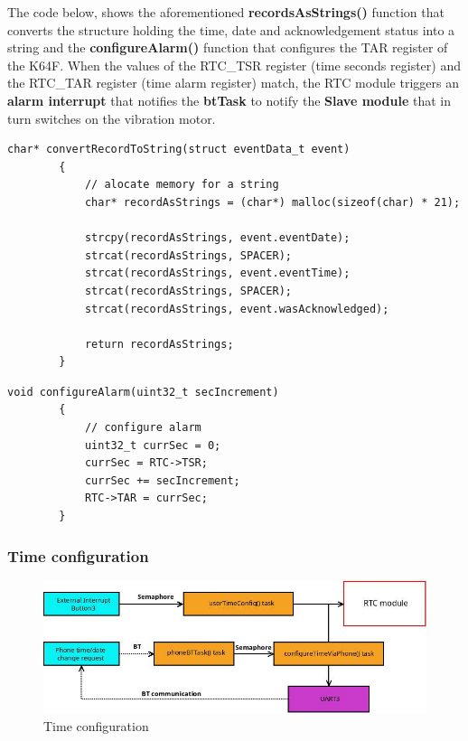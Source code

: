 \documentclass[12pt,a4paper]{article}
\begin{document}
        The code below, shows the aforementioned {\bfseries recordsAsStrings()} function that converts the structure holding the time, date and acknowledgement status into a string and the {\bfseries configureAlarm()} function that configures the TAR register of the K64F. When the values of the RTC\_TSR register (time seconds register) and the RTC\_TAR register (time alarm register) match, the RTC module triggers an {\bfseries alarm interrupt} that notifies the {\bfseries btTask} to notify the {\bfseries Slave module} that in turn switches on the vibration motor.
        \begin{lstlisting}[label={lst:crtString}, caption=convertRecordToString()]
        char* convertRecordToString(struct eventData_t event)
        {
            // alocate memory for a string
            char* recordAsStrings = (char*) malloc(sizeof(char) * 21);

            strcpy(recordAsStrings, event.eventDate);
            strcat(recordAsStrings, SPACER);
            strcat(recordAsStrings, event.eventTime);
            strcat(recordAsStrings, SPACER);
            strcat(recordAsStrings, event.wasAcknowledged);

            return recordAsStrings;
        }
        \end{lstlisting}
        
        \begin{lstlisting}[label={lst:confAlarm}, caption=configureAlarm()]
        void configureAlarm(uint32_t secIncrement)
        {
            // configure alarm
            uint32_t currSec = 0;
            currSec = RTC->TSR;
            currSec += secIncrement;
            RTC->TAR = currSec;
        }
        \end{lstlisting}
        
        \subsubsection*{Time configuration}\label{section:timeConfig}
        \begin{figure}
         \centering
         \includegraphics[width=\textwidth]{extInt_and_phone.jpg}
         \caption{Time configuration}
        \end{figure}
\end{document}
